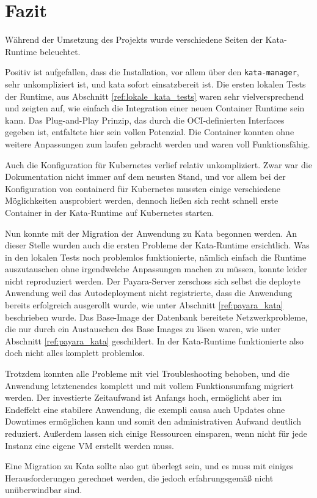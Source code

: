 \chapter{Fazit}

Während der Umsetzung des Projekts wurde verschiedene Seiten der Kata-Runtime beleuchtet.

Positiv ist aufgefallen, dass die Installation, vor allem über den \texttt{kata-manager}, sehr unkompliziert ist, und kata sofort einsatzbereit ist.
Die ersten lokalen Tests der Runtime, aus Abschnitt \ref{ref:lokale_kata_tests} waren sehr vielversprechend und zeigten auf, wie einfach die Integration einer neuen Container Runtime sein kann.
Das Plug-and-Play Prinzip, das durch die \ac{OCI}-definierten Interfaces gegeben ist, entfaltete hier sein vollen Potenzial.
Die Container konnten ohne weitere Anpassungen zum laufen gebracht werden und waren voll Funktionsfähig.

Auch die Konfiguration für Kubernetes verlief relativ unkompliziert. 
Zwar war die Dokumentation nicht immer auf dem neusten Stand, und vor allem bei der Konfiguration von containerd für Kubernetes mussten einige verschiedene Möglichkeiten ausprobiert werden, dennoch ließen sich recht schnell erste Container in der Kata-Runtime auf Kubernetes starten.

Nun konnte mit der Migration der Anwendung zu Kata begonnen werden.
An dieser Stelle wurden auch die ersten Probleme der Kata-Runtime ersichtlich.
Was in den lokalen Tests noch problemlos funktionierte, nämlich einfach die Runtime auszutauschen ohne irgendwelche Anpassungen machen zu müssen, konnte leider nicht reproduziert werden.
Der Payara-Server zerschoss sich selbst die deployte Anwendung weil das Autodeployment nicht registrierte, dass die Anwendung bereits erfolgreich ausgerollt wurde, wie unter Abschnitt \ref{ref:payara_kata} beschrieben wurde.
Das Base-Image der Datenbank bereitete Netzwerkprobleme, die nur durch ein Austauschen des Base Images zu lösen waren, wie unter Abschnitt \ref{ref:payara_kata} geschildert.
In der Kata-Runtime funktionierte also doch nicht alles komplett problemlos.

Trotzdem konnten alle Probleme mit viel Troubleshooting behoben, und die Anwendung letztenendes komplett und mit vollem Funktionsumfang migriert werden.
Der investierte Zeitaufwand ist Anfangs hoch, ermöglicht aber im Endeffekt eine stabilere Anwendung, die exempli causa auch Updates ohne Downtimes ermöglichen kann und somit den administrativen Aufwand deutlich reduziert.
Außerdem lassen sich einige Ressourcen einsparen, wenn nicht für jede Instanz eine eigene \ac{VM} erstellt werden muss.

Eine Migration zu Kata sollte also gut überlegt sein, und es muss mit einiges Herausforderungen gerechnet werden, die jedoch erfahrungsgemäß nicht unüberwindbar sind.